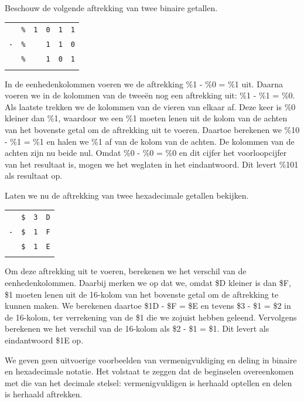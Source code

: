 Beschouw de volgende aftrekking van twee binaire getallen.

\begin{center}
	\begin{tabular}{cccccc}
							& \texttt{\%} & \texttt{1} & \texttt{0} & \texttt{1} & \texttt{1} \\	\texttt{-}	& \texttt{\%} &            & \texttt{1} & \texttt{1} & \texttt{0} \\ \hline						  & \texttt{\%} &            & \texttt{1} & \texttt{0} & \texttt{1} \\ \hhline{======}
	\end{tabular}
\end{center}
In de eenhedenkolommen voeren we de aftrekking \%1 - \%0 = \%1 uit. Daarna voeren we in de kolommen van de tweeën nog een aftrekking uit: \%1 - \%1 = \%0. Als laatste trekken we de kolommen van de vieren van elkaar af. Deze keer is \%0 kleiner dan \%1, waardoor we een \%1 moeten lenen uit de kolom van de achten van het bovenste getal om de aftrekking uit te voeren. Daartoe berekenen we \%10 - \%1 = \%1 en halen we \%1 af van de kolom van de achten. De kolommen van de achten zijn nu beide nul. Omdat \%0 - \%0 = \%0 en dit cijfer het voorloopcijfer van het resultaat is, mogen we het weglaten in het eindantwoord. Dit levert \%101 als resultaat op.

Laten we nu de aftrekking van twee hexadecimale getallen bekijken.

\begin{center}
	\begin{tabular}{cccc}
								& \texttt{\$} & \texttt{3} & \texttt{D} \\		\texttt{-}  & \texttt{\$} & \texttt{1} & \texttt{F} \\ \hline								& \texttt{\$} & \texttt{1} & \texttt{E} \\ \hhline{====}
	\end{tabular}
\end{center}

Om deze aftrekking uit te voeren, berekenen we het verschil van de eenhedenkolommen. Daarbij merken we op dat we, omdat \$D kleiner is dan \$F, \$1 moeten lenen uit de 16-kolom van het bovenste getal om de aftrekking te kunnen maken. We berekenen daartoe \$1D - \$F = \$E en tevens \$3 - \$1 = \$2 in de 16-kolom, ter verrekening van de \$1 die we zojuist hebben geleend. Vervolgens berekenen we het verschil van de 16-kolom als \$2 - \$1 = \$1. Dit levert als eindantwoord \$1E op.

We geven geen uitvoerige voorbeelden van vermenigvuldiging en deling in binaire en hexadecimale notatie. Het volstaat te zeggen dat de beginselen overeenkomen met die van het decimale stelsel: vermenigvuldigen is herhaald optellen en delen is herhaald aftrekken.

